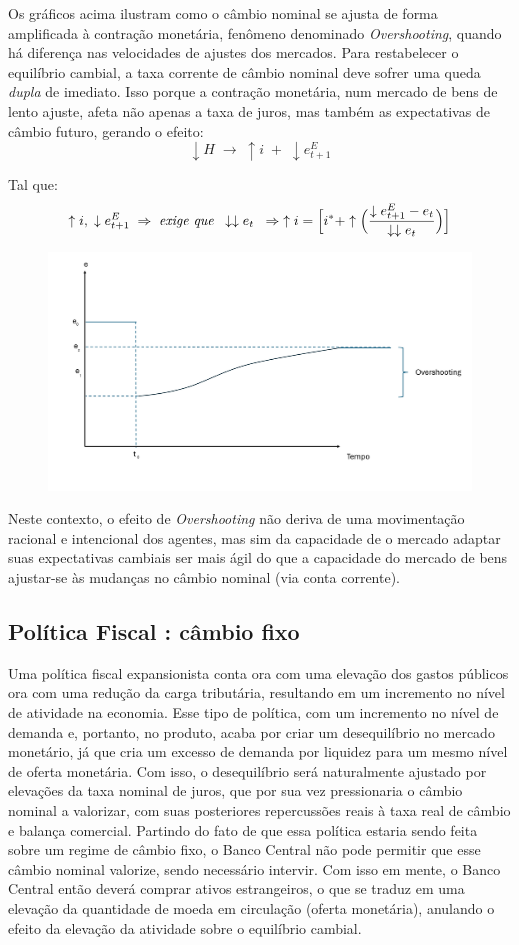 \documentclass[a4paper,12pt]{article}[abntex2]
\begin{document}
Os gráficos acima ilustram como o câmbio nominal se ajusta de forma amplificada
à contração monetária, fenômeno denominado \textit{Overshooting}, quando há diferença
nas velocidades de ajustes dos mercados.  
Para restabelecer o equilíbrio cambial, a taxa corrente de câmbio nominal deve
sofrer uma queda \emph{dupla} de imediato.  
Isso porque a contração monetária, num mercado de bens de lento ajuste,
afeta não apenas a taxa de juros, mas também as expectativas de câmbio futuro,
gerando o efeito:
\[
\downarrow H \;\longrightarrow\; \uparrow i \;+\; \downarrow e_{t+1}^{E}
\]


Tal que:
\[
\uparrow i,\;\downarrow e_{t+1}^{E}\;\Rightarrow\;
\textit{exige que}\;\;\downarrow\downarrow e_{t}\;\;\Rightarrow\;
\uparrow i = \Bigl[i^{\ast}+\uparrow
\Bigl(\frac{\downarrow e_{t+1}^{E}-e_{t}}{\downarrow\downarrow e_{t}}\Bigr)\Bigr]
\]

\begin{figure}[H]
    \centering
    \includegraphics[width=0.7\linewidth]{Imagens/a23i5.png}
\end{figure}

Neste contexto, o efeito de \textit{Overshooting} não deriva de uma
movimentação racional e intencional dos agentes, mas sim da capacidade de
o mercado adaptar suas expectativas cambiais ser mais ágil do que a
capacidade do mercado de bens ajustar-se às mudanças no câmbio nominal
(via conta corrente).

\subsection{\textbf{Política Fiscal : câmbio fixo}}

Uma política fiscal expansionista conta ora com uma elevação dos gastos públicos ora com uma redução da carga tributária, resultando em um incremento no nível de atividade na economia. Esse tipo de política, com um incremento no nível de demanda e, portanto, no produto, acaba por criar um desequilíbrio no mercado monetário, já que cria um excesso de demanda por liquidez para um mesmo nível de oferta monetária. Com isso, o desequilíbrio será naturalmente ajustado por elevações da taxa nominal de juros, que por sua vez pressionaria o câmbio nominal a valorizar, com suas posteriores repercussões reais à taxa real de câmbio e balança comercial. Partindo do fato de que essa política estaria sendo feita sobre um regime de câmbio fixo, o Banco Central não pode permitir que esse câmbio nominal valorize, sendo necessário intervir. Com isso em mente, o Banco Central então deverá comprar ativos estrangeiros, o que se traduz em uma elevação da quantidade de moeda em circulação (oferta monetária), anulando o efeito da elevação da atividade sobre o equilíbrio cambial. 
\end{document}
